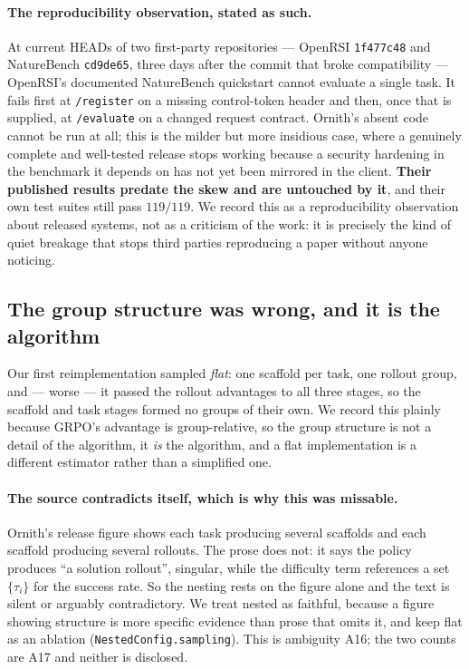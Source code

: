 \paragraph{The reproducibility observation, stated as such.} At current HEADs of two
first-party repositories --- OpenRSI \texttt{1f477c48} and NatureBench \texttt{cd9de65},
three days after the commit that broke compatibility --- OpenRSI's documented NatureBench
quickstart cannot evaluate a single task. It fails first at \texttt{/register} on a missing
control-token header and then, once that is supplied, at \texttt{/evaluate} on a changed
request contract. Ornith's absent code cannot be run at all; this is the milder but more
insidious case, where a genuinely complete and well-tested release stops working because a
security hardening in the benchmark it depends on has not yet been mirrored in the client.
\textbf{Their published results predate the skew and are untouched by it}, and their own
test suites still pass $119/119$. We record this as a reproducibility observation about
released systems, not as a criticism of the work: it is precisely the kind of quiet
breakage that stops third parties reproducing a paper without anyone noticing.

\subsection{The group structure was wrong, and it is the algorithm}
\label{sec:ornithnested}

Our first reimplementation sampled \emph{flat}: one scaffold per task, one rollout group,
and --- worse --- it passed the rollout advantages to all three stages, so the scaffold and
task stages formed no groups of their own. We record this plainly because GRPO's advantage
is group-relative, so the group structure is not a detail of the algorithm, it \emph{is} the
algorithm, and a flat implementation is a different estimator rather than a simplified one.

\paragraph{The source contradicts itself, which is why this was missable.} Ornith's release
figure shows each task producing several scaffolds and each scaffold producing several
rollouts. The prose does not: it says the policy produces ``a solution rollout'', singular,
while the difficulty term references a set $\{\tau_i\}$ for the success rate. So the nesting
rests on the figure alone and the text is silent or arguably contradictory. We treat nested
as faithful, because a figure showing structure is more specific evidence than prose that
omits it, and keep flat as an ablation (\texttt{NestedConfig.sampling}). This is ambiguity
A16; the two counts are A17 and neither is disclosed.

